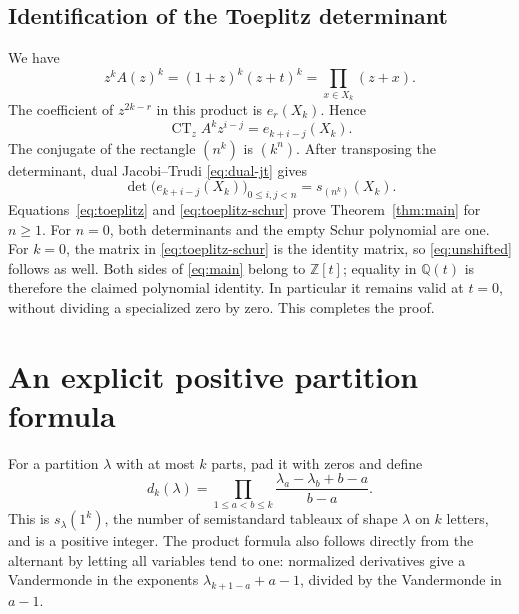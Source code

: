 \documentclass[11pt,a4paper]{article}
\theoremstyle{definition}
\theoremstyle{remark}
\newcommand{\CT}{\operatorname{CT}_z}
\newcommand{\Q}{\mathbb Q}
\newcommand{\Z}{\mathbb Z}
\numberwithin{equation}{section}
\begin{document}
\subsection{Identification of the Toeplitz determinant}
We have
\begin{equation}
 z^kA(z)^k=(1+z)^k(z+t)^k
          =\prod_{x\in X_k}(z+x).
 \label{eq:elementary-symbol}
\end{equation}
The coefficient of \(z^{2k-r}\) in this product is \(e_r(X_k)\). Hence
\begin{equation}
 \CT A^kz^{i-j}=e_{k+i-j}(X_k).
 \label{eq:entry-e}
\end{equation}
The conjugate of the rectangle \((n^k)\) is \((k^n)\). After transposing
the determinant, dual Jacobi--Trudi \eqref{eq:dual-jt} gives
\begin{equation}
 \det\bigl(e_{k+i-j}(X_k)\bigr)_{0\le i,j<n}=s_{(n^k)}(X_k).
 \label{eq:toeplitz-schur}
\end{equation}
Equations~\eqref{eq:toeplitz} and \eqref{eq:toeplitz-schur} prove
Theorem~\ref{thm:main} for \(n\ge1\). For \(n=0\), both determinants and
the empty Schur polynomial are one. For \(k=0\), the matrix in
\eqref{eq:toeplitz-schur} is the identity matrix, so
\eqref{eq:unshifted} follows as well. Both sides of \eqref{eq:main} belong
to \(\Z[t]\); equality in \(\Q(t)\) is therefore the claimed polynomial
identity. In particular it remains valid at \(t=0\), without dividing a
specialized zero by zero. This completes the proof.

\section{An explicit positive partition formula}
\label{sec:positive}
For a partition \(\lambda\) with at most \(k\) parts, pad it with zeros
and define
\begin{equation}
 d_k(\lambda)=\prod_{1\le a<b\le k}
 \frac{\lambda_a-\lambda_b+b-a}{b-a}.
 \label{eq:weyl-dimension}
\end{equation}
This is \(s_\lambda(1^k)\), the number of semistandard tableaux of shape
\(\lambda\) on \(k\) letters, and is a positive integer. The product
formula also follows directly from the alternant by letting all variables
tend to one: normalized derivatives give a Vandermonde in the exponents
\(\lambda_{k+1-a}+a-1\), divided by the Vandermonde in \(a-1\).
\end{document}
